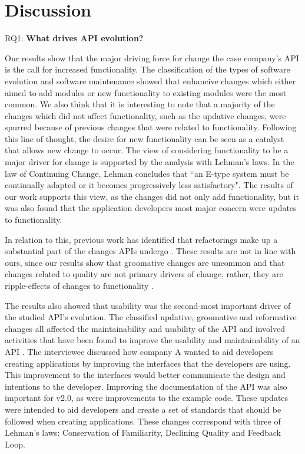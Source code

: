 \documentclass{sig-alternate}
\begin{document}
\newpage

\section{Discussion} \label{discussion}

\noindent
RQ1: \textbf{What drives API evolution?}
\smallskip

Our results show that the major driving force for change the case company's API is the call for increased functionality. The classification of the types of software evolution and software maintenance showed that enhancive changes which either aimed to add modules or new functionality to existing modules were the most common. We also think that it is interesting to note that a majority of the changes which did not affect functionality, such as the updative changes, were spurred because of previous changes that were related to functionality. Following this line of thought, the desire for new functionality can be seen as a catalyst that allows new change to occur. The view of considering functionality to be a major driver for change is supported by the analysis with Lehman's laws. In the law of Continuing Change, Lehman concludes that ``an E-type system must be continually adapted or it becomes progressively less satisfactory". The results of our work supports this view, as the changes did not only add functionality, but it was also found that the application developers most major concern were updates to functionality. 

In relation to this, previous work has identified that refactorings make up a substantial part of the changes APIs undergo \cite{dig2005role, dig2006apis, henkel2005catchup, xing2006refactoring}. These results are not in line with ours, since our results show that groomative changes are uncommon and that changes related to quality are not primary drivers of change, rather, they are ripple-effects of changes to functionality \cite{robbes2012developers}.

The results also showed that usability was the second-most important driver of the studied API's evolution. The classified updative, groomative and reformative changes all affected the maintainability and usability of the API and involved activities that have been found to improve the usability and maintainability of an API \cite{afonso2012evaluating, clarke2004measuring, piccioni2013empirical, shi2011empirical}. The interviewee discussed how company A wanted to aid developers creating applications by improving the interfaces that the developers are using. This improvement to the interfaces would better communicate the design and intentions to the developer. Improving the documentation of the API was also important for v2.0, as were improvements to the example code. These updates were intended to aid developers and create a set of standards that should be followed when creating applications. These changes correspond with three of Lehman's laws: Conservation of Familiarity, Declining Quality and Feedback Loop.  
\end{document}
